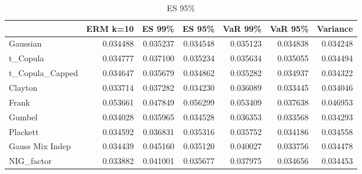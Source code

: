 \begin{table}
\begin{tabular}{lrrrrrr}
\toprule
{} &  ERM k=10 &    ES 99\% &    ES 95\% &   VaR 99\% &   VaR 95\% &  Variance \\
\midrule
Gaussian        &  0.034488 &  0.035237 &  0.034548 &  0.035123 &  0.034838 &  \color{blue}0.034248 \\
t\_Copula        &  0.034777 &  0.037100 &  0.035234 &  0.035634 &  0.035055 &  \color{blue}0.034494 \\
t\_Copula\_Capped &  0.034647 &  0.035679 &  0.034862 &  0.035282 &  0.034937 &  \color{blue}0.034322 \\
Clayton         &  0.033714 &  0.037282 &  0.034230 &  0.036089 &  \color{blue}0.033445 &  0.034046 \\
Frank           &  0.053661 &  0.047849 &  0.056299 &  0.053409 &  \color{blue}0.037638 &  0.046953 \\
Gumbel          &  0.034028 &  0.035965 &  0.034528 &  0.036353 &  \color{blue}0.033568 &  0.034293 \\
Plackett        &  0.034592 &  0.036831 &  0.035316 &  0.035752 &  \color{blue}0.034186 &  0.034558 \\
Gauss Mix Indep &  0.034439 &  0.045160 &  0.035120 &  0.040027 &  \color{blue}0.033756 &  0.034478 \\
NIG\_factor      &  \color{blue}0.033882 &  0.041001 &  0.035677 &  0.037975 &  0.034656 &  0.034453 \\
\bottomrule
\end{tabular}
\caption{ES 95\%}
\end{table}

